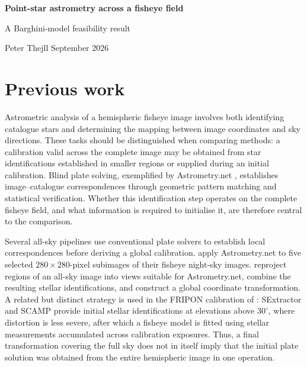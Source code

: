 \documentclass[12pt,a4paper]{article}
\begin{document}
\begin{center}
  {\LARGE\bfseries Point-star astrometry across a fisheye field\par}
  \vspace{4pt}
  {\large A Barghini-model feasibility result\par}
  \vspace{5pt}
  Peter Thejll \quad\textbullet{} September 2026
\end{center}

\section{Previous work}
\label{sec:previous-work}

Astrometric analysis of a hemispheric fisheye image involves both identifying
catalogue stars and determining the mapping between image coordinates and sky
directions. These tasks should be distinguished when comparing methods: a
calibration valid across the complete image may be obtained from star
identifications established in smaller regions or supplied during an initial
calibration. Blind plate solving, exemplified by Astrometry.net
\citep{Lang2010}, establishes image--catalogue correspondences through geometric
pattern matching and statistical verification. Whether this identification step
operates on the complete fisheye field, and what information is required to
initialise it, are therefore central to the comparison.

Several all-sky pipelines use conventional plate solvers to establish local
correspondences before deriving a global calibration. \citet{Hung2024} apply
Astrometry.net to five selected $280\times280$-pixel subimages of their fisheye
night-sky images. \citet{Yin2025} reproject regions of an all-sky image into
views suitable for Astrometry.net, combine the resulting stellar
identifications, and construct a global coordinate transformation. A related
but distinct strategy is used in the FRIPON calibration of
\citet{Jeanne2019}: SExtractor and SCAMP provide initial stellar
identifications at elevations above $30^\circ$, where distortion is less severe,
after which a fisheye model is fitted using stellar measurements accumulated
across calibration exposures. Thus, a final transformation covering the full
sky does not in itself imply that the initial plate solution was obtained from
the entire hemispheric image in one operation.
\end{document}
